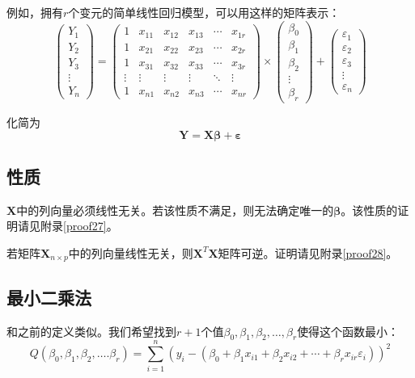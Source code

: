 \documentclass[UTF8]{ctexart}
\begin{document}
例如，拥有$r$个变元的简单线性回归模型，可以用这样的矩阵表示：
\[
	\begin{pmatrix}
		Y_1 \\
		Y_2 \\
		Y_3 \\
		\vdots \\
		Y_n
	\end{pmatrix}
	=
	\begin{pmatrix}
		1 & x_{11} & x_{12} & x_{13} & \cdots & x_{1r} \\
		1 & x_{21} & x_{22} & x_{23} & \cdots & x_{2r} \\
		1 & x_{31} & x_{32} & x_{33} & \cdots & x_{3r} \\
		\vdots & \vdots & \vdots & \vdots & \ddots & \vdots \\
		1 & x_{n1} & x_{n2} & x_{n3} & \cdots & x_{nr}
	\end{pmatrix}
	\times
	\begin{pmatrix}
		\beta_0 \\
		\beta_1 \\
		\beta_2 \\
		\vdots \\
		\beta_r
	\end{pmatrix}
	+
	\begin{pmatrix}
		\varepsilon_1 \\
		\varepsilon_2 \\
		\varepsilon_3 \\
		\vdots \\
		\varepsilon_n
	\end{pmatrix}
\]

化简为
\[
	\boldsymbol{Y}=\boldsymbol{X\beta}+\boldsymbol{\varepsilon}
\]

\subsection{性质}
$\boldsymbol{X}$中的列向量必须线性无关。若该性质不满足，则无法确定唯一的$\boldsymbol{\beta}$。该性质的证明请见附录\ref{proof27}。

若矩阵$\boldsymbol{X}_{n\times p}$中的列向量线性无关，则$\boldsymbol{X}^T\boldsymbol{X}$矩阵可逆。证明请见附录\ref{proof28}。



\subsection{最小二乘法}
和之前的定义类似。我们希望找到$r+1$个值$\beta_0,\beta_1,\beta_2,\dots,\beta_r$使得这个函数最小：
\[
Q(\beta_0,\beta_1,\beta_2,\dots.\beta_r)=\sum_{i=1}^n(y_i-(\beta_0+\beta_1x_{i1}+\beta_2x_{i2}+\cdots+\beta_rx_{ir}\varepsilon_i))^2
\]
\end{document}
